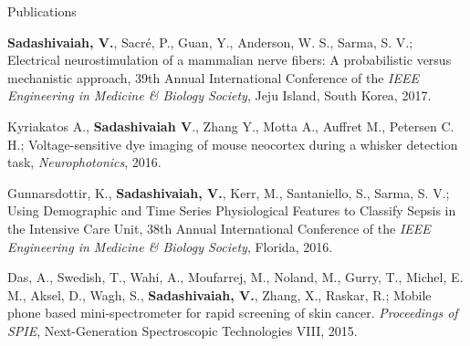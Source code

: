 \documentclass{resume}
\begin{document}
\begin{rSection}{Publications}
\begin{publications}
\item \textbf{Sadashivaiah, V.}, Sacré, P., Guan, Y., Anderson, W. S., Sarma, S. V.; Electrical neurostimulation of a mammalian nerve fibers: A probabilistic versus mechanistic approach, 39th Annual International Conference of the \textit{IEEE Engineering in Medicine \& Biology Society}, Jeju Island, South Korea, 2017.

\item Kyriakatos A., \textbf{Sadashivaiah V}., Zhang Y., Motta A., Auffret M., Petersen C. H.; Voltage-sensitive dye imaging of mouse neocortex during a whisker detection task, \textit{Neurophotonics}, 2016.

\item Gunnarsdottir, K., \textbf{Sadashivaiah, V.}, Kerr, M., Santaniello, S., Sarma, S. V.; Using Demographic and Time Series Physiological Features to Classify Sepsis in the Intensive Care Unit, 38th Annual International Conference of the \textit{IEEE Engineering in Medicine \& Biology Society}, Florida, 2016.

\item Das, A., Swedish, T., Wahi, A., Moufarrej, M., Noland, M., Gurry, T., Michel, E. M., Aksel, D., Wagh, S., \textbf{Sadashivaiah, V.}, Zhang, X., Raskar, R.; Mobile phone based mini-spectrometer for rapid screening of skin cancer. \textit{Proceedings of SPIE}, Next-Generation Spectroscopic Technologies VIII, 2015.
\newpage
\end{publications}
\end{rSection} 
\end{document}
